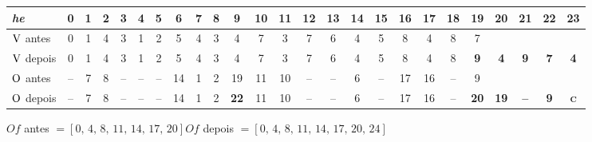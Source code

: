 \begin{tabular}{lcccccccccccccccccccccccc}
\textit{he} & 0 & 1 & 2 & 3 & 4 & 5 & 6 & 7 & 8 & 9 & 10 & 11 & 12 & 13 & 14 & 15 & 16 & 17 & 18 & 19 & 20 & 21 & 22 & 23 \\ \hline
$\mathrm{V}$ antes & 0 & 1 & 4 & 3 & 1 & 2 & 5 & 4 & 3 & 4 & 7 & 3 & 7 & 6 & 4 & 5 & 8 & 4 & 8 & 7 &  &  &  &  \\
$\mathrm{V}$ depois & 0 & 1 & 4 & 3 & 1 & 2 & 5 & 4 & 3 & 4 & 7 & 3 & 7 & 6 & 4 & 5 & 8 & 4 & 8 & \textcolor{red!75!black}{\textbf{9}} & \textcolor{orange!50!black}{\textbf{4}} & \textcolor{orange!50!black}{\textbf{9}} & \textcolor{orange!50!black}{\textbf{7}} & \textcolor{orange!50!black}{\textbf{4}} \\ \hline
$\mathrm{O}$ antes & -- & 7 & 8 & -- & -- & -- & 14 & 1 & 2 & 19 & 11 & 10 & -- & -- & 6 & -- & 17 & 16 & -- & 9 &  &  &  &  \\
$\mathrm{O}$ depois & -- & 7 & 8 & -- & -- & -- & 14 & 1 & 2 & \textcolor{red!75!black}{\textbf{22}} & 11 & 10 & -- & -- & 6 & -- & 17 & 16 & -- & \textcolor{red!75!black}{\textbf{20}} & \textcolor{orange!50!black}{\textbf{19}} & \textcolor{orange!50!black}{\textbf{--}} & \textcolor{orange!50!black}{\textbf{9}} & \textcolor{orange!50!black}{\textbf{\textsc{c}}} \\
\end{tabular}
\par\smallskip $Of$ antes $= [0,\,4,\,8,\,11,\,14,\,17,\,20]$\qquad $Of$ depois $= [0,\,4,\,8,\,11,\,14,\,17,\,20,\,24]$
